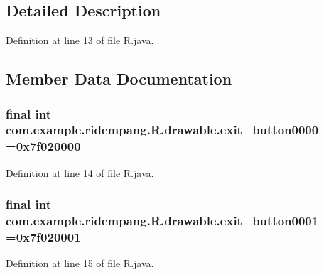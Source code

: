 \subsection{Detailed Description}


Definition at line 13 of file R.\-java.



\subsection{Member Data Documentation}
\hypertarget{classcom_1_1example_1_1ridempang_1_1_r_1_1drawable_a9a2fe33339f911270f367dc62585ba2a}{
\subsubsection[{exit\-\_\-button0000}]{\setlength{\rightskip}{0pt plus 5cm}final int com.\-example.\-ridempang.\-R.\-drawable.\-exit\-\_\-button0000 =0x7f020000\hspace{0.3cm}{\ttfamily [static]}}}\label{classcom_1_1example_1_1ridempang_1_1_r_1_1drawable_a9a2fe33339f911270f367dc62585ba2a}


Definition at line 14 of file R.\-java.

\hypertarget{classcom_1_1example_1_1ridempang_1_1_r_1_1drawable_a2e62b83d6632bfb0298a83f3be4a92cb}{
\subsubsection[{exit\-\_\-button0001}]{\setlength{\rightskip}{0pt plus 5cm}final int com.\-example.\-ridempang.\-R.\-drawable.\-exit\-\_\-button0001 =0x7f020001\hspace{0.3cm}{\ttfamily [static]}}}\label{classcom_1_1example_1_1ridempang_1_1_r_1_1drawable_a2e62b83d6632bfb0298a83f3be4a92cb}


Definition at line 15 of file R.\-java.

